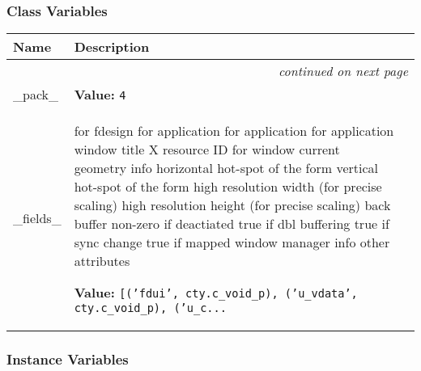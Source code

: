   \subsubsection{Class Variables}

    \vspace{-1cm}
\hspace{\varindent}\begin{longtable}{|p{\varnamewidth}|p{\vardescrwidth}|l}
\cline{1-2}
\cline{1-2} \centering \textbf{Name} & \centering \textbf{Description}& \\
\cline{1-2}
\endhead\cline{1-2}\multicolumn{3}{r}{\small\textit{continued on next page}}\\\endfoot\cline{1-2}
\endlastfoot\raggedright \_\-p\-a\-c\-k\-\_\- & \raggedright \textbf{Value:} 
{\tt 4}&\\
\cline{1-2}
\raggedright \_\-f\-i\-e\-l\-d\-s\-\_\- & \raggedright for fdesign
for application
for application
for application
window title
X resource ID for window
current geometry info
horizontal hot-spot of the form
vertical hot-spot of the form
high resolution width (for precise scaling)
high resolution height (for precise scaling)
back buffer
non-zero if deactiated
true if dbl buffering
true if sync change
true if mapped
window manager info
other attributes

\textbf{Value:} 
{\tt [('fdui', cty.c\_void\_p), ('u\_vdata', cty.c\_void\_p), ('u\_c\texttt{...}}&\\
\cline{1-2}
\end{longtable}



  \subsubsection{Instance Variables}

